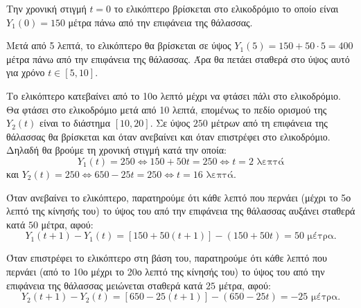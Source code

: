 
\begin{alist}
\item Την χρονική στιγμή $t = 0$ το ελικόπτερο βρίσκεται στο ελικοδρόμιο το οποίο είναι $Y_1(0) = 150$ μέτρα πάνω από την επιφάνεια της θάλασσας.

\item Μετά από 5 λεπτά, το ελικόπτερο θα βρίσκεται σε ύψος $Y_1(5) = 150 + 50 \cdot 5 = 400$ μέτρα πάνω από την επιφάνεια της θάλασσας. Άρα θα πετάει σταθερά στο ύψος αυτό για χρόνο $t \in [5, 10]$.

\item Το ελικόπτερο κατεβαίνει από το 10ο λεπτό μέχρι να φτάσει πάλι στο ελικοδρόμιο. Θα φτάσει στο ελικοδρόμιο μετά από 10 λεπτά, επομένως το πεδίο ορισμού της $Y_2(t)$ είναι το διάστημα $[10, 20]$.
Σε ύψος $250$ μέτρων από τη επιφάνεια της θάλασσας θα βρίσκεται και όταν ανεβαίνει και όταν επιστρέφει στο ελικοδρόμιο. Δηλαδή θα βρούμε τη χρονική στιγμή κατά την οποία:
\[Y_1(t) = 250 \Leftrightarrow 150 + 50t = 250 \Leftrightarrow t = 2 \text{ λεπτά}\]
και $Y_2(t) = 250 \Leftrightarrow 650 - 25t = 250 \Leftrightarrow t = 16 \text{ λεπτά}$.

\item 
\begin{rlist}
\item Όταν ανεβαίνει το ελικόπτερο, παρατηρούμε ότι κάθε λεπτό που περνάει (μέχρι το 5ο λεπτό της κίνησής του) το ύψος του από την επιφάνεια της θάλασσας αυξάνει σταθερά κατά $50$ μέτρα, αφού:
\[Y_1(t + 1) - Y_1(t) = [150 + 50(t + 1)] - (150 + 50t) = 50 \text{ μέτρα}.\]

\item Όταν επιστρέφει το ελικόπτερο στη βάση του, παρατηρούμε ότι κάθε λεπτό που περνάει (από το 10ο μέχρι το 20ο λεπτό της κίνησής του) το ύψος του από την επιφάνεια της θάλασσας μειώνεται σταθερά κατά $25$ μέτρα, αφού:
\[Y_2(t + 1) - Y_2(t) = [650 - 25(t + 1)] - (650 - 25t) = -25 \text{ μέτρα}.\]
\end{rlist}
\end{alist}

